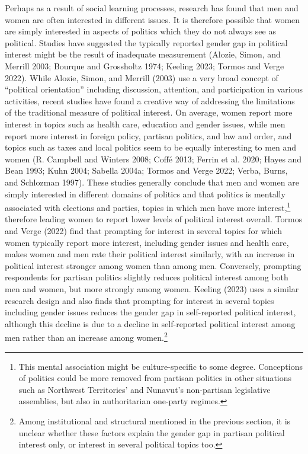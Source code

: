 \documentclass[
  letterpaper,
  DIV=11,
  numbers=noendperiod]{scrreprt}
\begin{document}
Perhaps as a result of social learning processes, research has found
that men and women are often interested in different issues. It is
therefore possible that women are simply interested in aspects of
politics which they do not always see as political. Studies have
suggested the typically reported gender gap in political interest might
be the result of inadequate measurement (Alozie, Simon, and Merrill
2003; Bourque and Grossholtz 1974; Keeling 2023; Tormos and Verge 2022).
While Alozie, Simon, and Merrill (2003) use a very broad concept of
``political orientation'' including discussion, attention, and
participation in various activities, recent studies have found a
creative way of addressing the limitations of the traditional measure of
political interest. On average, women report more interest in topics
such as health care, education and gender issues, while men report more
interest in foreign policy, partisan politics, and law and order, and
topics such as taxes and local politics seem to be equally interesting
to men and women (R. Campbell and Winters 2008; Coffé 2013; Ferrin et
al. 2020; Hayes and Bean 1993; Kuhn 2004; Sabella 2004a; Tormos and
Verge 2022; Verba, Burns, and Schlozman 1997). These studies generally
conclude that men and women are simply interested in different domains
of politics and that politics is mentally associated with elections and
parties, topics in which men have more interest,\footnote{This mental
  association might be culture-specific to some degree. Conceptions of
  politics could be more removed from partisan politics in other
  situations such as Northwest Territories' and Nunavut's non-partisan
  legislative assemblies, but also in authoritarian one-party regimes.}
therefore leading women to report lower levels of political interest
overall. Tormos and Verge (2022) find that prompting for interest in
several topics for which women typically report more interest, including
gender issues and health care, makes women and men rate their political
interest similarly, with an increase in political interest stronger
among women than among men. Conversely, prompting respondents for
partisan politics slightly reduces political interest among both men and
women, but more strongly among women. Keeling (2023) uses a similar
research design and also finds that prompting for interest in several
topics including gender issues reduces the gender gap in self-reported
political interest, although this decline is due to a decline in
self-reported political interest among men rather than an increase among
women.\footnote{Among institutional and structural mentioned in the
  previous section, it is unclear whether these factors explain the
  gender gap in partisan political interest only, or interest in several
  political topics too.}
\end{document}
